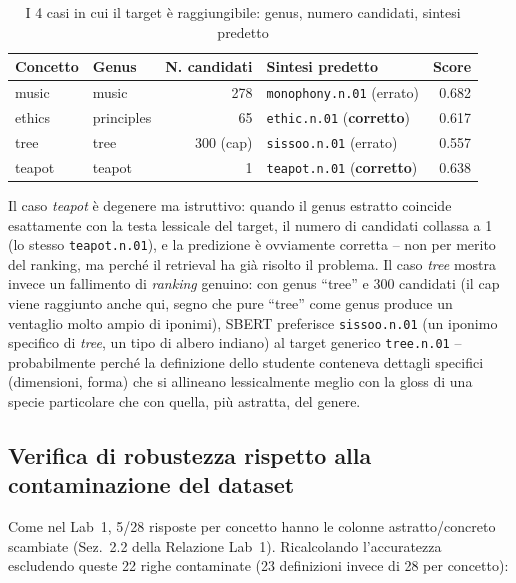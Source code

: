 \documentclass[12pt,a4paper]{article}
\begin{document}
\begin{table}[H]
  \centering
  \caption{I 4 casi in cui il target \`e raggiungibile: genus, numero candidati, sintesi predetto}
  \small
  \begin{tabular}{llrlr}
    \toprule
    \textbf{Concetto} & \textbf{Genus} & \textbf{N. candidati} & \textbf{Sintesi predetto} & \textbf{Score} \\
    \midrule
    music  & music      & 278 & \texttt{monophony.n.01} (errato) & 0.682 \\
    ethics & principles &  65 & \texttt{ethic.n.01} (\textbf{corretto}) & 0.617 \\
    tree   & tree       & 300 (cap) & \texttt{sissoo.n.01} (errato) & 0.557 \\
    teapot & teapot     &   1 & \texttt{teapot.n.01} (\textbf{corretto}) & 0.638 \\
    \bottomrule
  \end{tabular}
\end{table}

Il caso \textit{teapot} \`e degenere ma istruttivo: quando il genus estratto coincide esattamente con la testa lessicale del target, il numero di candidati collassa a 1 (lo stesso \texttt{teapot.n.01}), e la predizione \`e ovviamente corretta -- non per merito del ranking, ma perch\'e il retrieval ha gi\`a risolto il problema. Il caso \textit{tree} mostra invece un fallimento di \emph{ranking} genuino: con genus ``tree'' e 300 candidati (il cap viene raggiunto anche qui, segno che pure ``tree'' come genus produce un ventaglio molto ampio di iponimi), SBERT preferisce \texttt{sissoo.n.01} (un iponimo specifico di \textit{tree}, un tipo di albero indiano) al target generico \texttt{tree.n.01} -- probabilmente perch\'e la definizione dello studente conteneva dettagli specifici (dimensioni, forma) che si allineano lessicalmente meglio con la gloss di una specie particolare che con quella, pi\`u astratta, del genere.

\subsection{Verifica di robustezza rispetto alla contaminazione del dataset}
\label{sec:contaminazione}

Come nel Lab~1, 5/28 risposte per concetto hanno le colonne astratto/concreto scambiate (Sez.~2.2 della Relazione Lab~1). Ricalcolando l'accuratezza escludendo queste 22 righe contaminate (23 definizioni invece di 28 per concetto):
\end{document}
